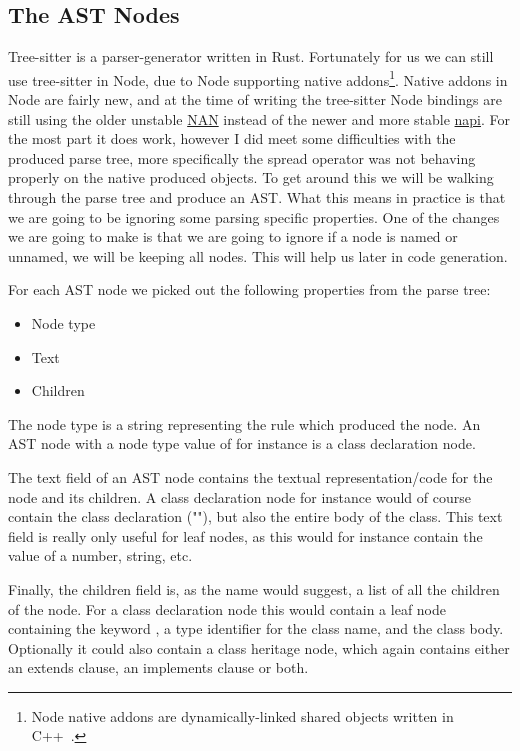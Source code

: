 
\subsection{The AST Nodes}\label{subsec:the-ast-nodes}

Tree-sitter is a parser-generator written in Rust.
Fortunately for us we can still use tree-sitter in Node, due to Node supporting native addons\footnote{Node native addons are dynamically-linked shared objects written in C++~\cite{nodenativeaddons}.}.
Native addons in Node are fairly new, and at the time of writing the tree-sitter Node bindings are still using the older unstable \hyperref[https://github.com/nodejs/nan]{NAN} instead of the newer and more stable \hyperref[https://nodejs.org/api/n-api.html]{napi}.
For the most part it does work, however I did meet some difficulties with the produced parse tree, more specifically the spread operator was not behaving properly on the native produced objects.
To get around this we will be walking through the parse tree and produce an AST\@.
What this means in practice is that we are going to be ignoring some parsing specific properties.
One of the changes we are going to make is that we are going to ignore if a node is named or unnamed, we will be keeping all nodes.
This will help us later in code generation.

For each AST node we picked out the following properties from the parse tree:

\begin{itemize}
    \item Node type
    \item Text
    \item Children
\end{itemize}

The node type is a string representing the rule which produced the node.
An AST node with a node type value of  for instance is a class declaration node.

The text field of an AST node contains the textual representation/code for the node and its children.
A class declaration node for instance would of course contain the class declaration (""), but also the entire body of the class.
This text field is really only useful for leaf nodes, as this would for instance contain the value of a number, string, etc.

Finally, the children field is, as the name would suggest, a list of all the children of the node.
For a class declaration node this would contain a leaf node containing the keyword , a type identifier for the class name, and the class body.
Optionally it could also contain a class heritage node, which again contains either an extends clause, an implements clause or both.

